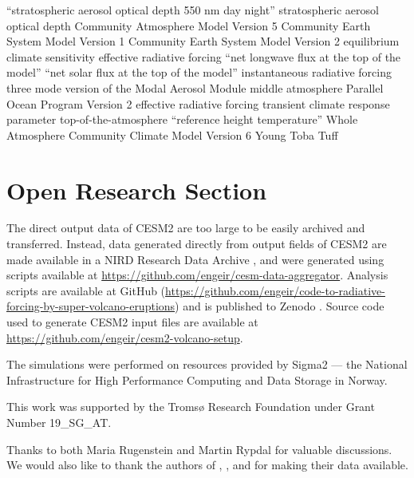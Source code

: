\documentclass[draft]{agujournal2019}
\begin{document}
  \begin{acronyms}
     ``stratospheric aerosol optical depth 550 nm day night''
     stratospheric aerosol optical depth  Community Atmosphere
    Model Version 5  Community Earth System Model Version 1 
    Community Earth System Model Version 2  equilibrium climate sensitivity
     effective radiative forcing  ``net longwave flux at the top of
    the model''  ``net solar flux at the top of the model'' 
    instantaneous radiative forcing  three mode version of the Modal Aerosol
    Module  middle atmosphere  Parallel Ocean Program Version 2
     effective radiative forcing  transient climate response
    parameter  top-of-the-atmosphere  ``reference height
    temperature''  Whole Atmosphere Community Climate Model Version 6
     Young Toba Tuff
  \end{acronyms}

  \section*{Open Research Section}


  The direct output data of CESM2 are too large to be easily archived and transferred.
  Instead, data generated directly from output fields of CESM2 are made available in a
  NIRD Research Data Archive \cite{enger2024}, and were generated using scripts
  available at \url{https://github.com/engeir/cesm-data-aggregator}. Analysis scripts
  are available at GitHub (\url{https://github.com/engeir/code-to-radiative-forcing-by-super-volcano-eruptions})
  and is published to Zenodo \cite{enger2024analysis}. Source code used to generate
  CESM2 input files are available at
  \url{https://github.com/engeir/cesm2-volcano-setup}.

  \acknowledgments

  The simulations were performed on resources provided by Sigma2 --- the National
  Infrastructure for High Performance Computing and Data Storage in Norway.

  This work was supported by the Tromsø Research Foundation under Grant Number
  19\_SG\_AT.

  Thanks to both Maria Rugenstein and Martin Rypdal for valuable discussions. We would
  also like to thank the authors of , , and
   for making their data available.

  
\end{document}
